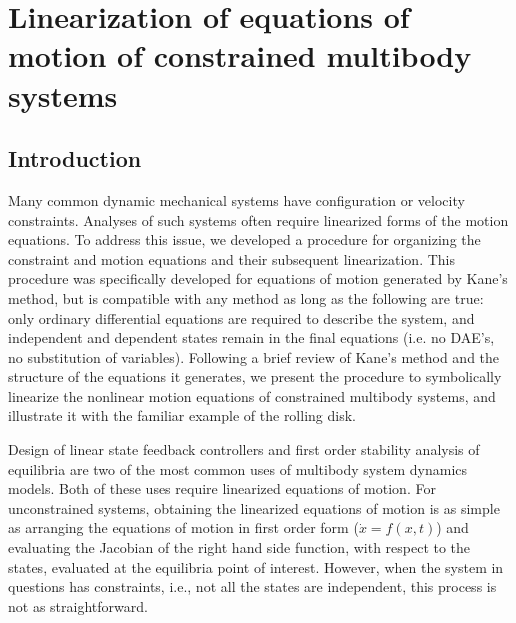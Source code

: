 \chapter{Linearization of equations of motion of constrained multibody systems}
\label{chapter3}
\section{Introduction}
\label{sec:intro}

Many common dynamic mechanical systems have configuration or velocity
constraints.  Analyses of such systems often require linearized forms of the
motion equations.  To address this issue, we developed a procedure for
organizing the constraint and motion equations and their subsequent
linearization.  This procedure was specifically developed for equations of
motion generated by Kane's method, but is compatible with any method as long as
the following are true: only ordinary differential equations are required to
describe the system, and independent and dependent states remain in the final
equations (i.e. no DAE's, no substitution of variables).  Following a brief
review of Kane's method and the structure of the equations it generates, we
present the procedure to symbolically linearize the nonlinear motion equations
of constrained multibody systems, and illustrate it with the familiar example
of the rolling disk.

Design of linear state feedback controllers and first order stability analysis
of equilibria are two of the most common uses of multibody system dynamics
models. Both of these uses require linearized equations of motion. For
unconstrained systems, obtaining the linearized equations of motion is as
simple as arranging the equations of motion in first order form ($\dot{x} =
f(x, t)$) and evaluating the Jacobian of the right hand side function, with
respect to the states, evaluated at the equilibria point of interest.  However,
when the system in questions has constraints, i.e., not all the states are
independent, this process is not as straightforward.

